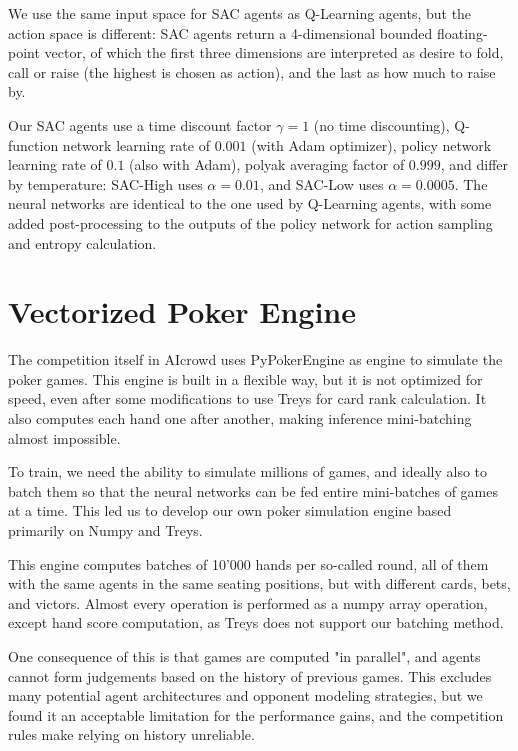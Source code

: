 We use the same input space for SAC agents as Q-Learning agents, but the action space is different: SAC agents return a 4-dimensional bounded floating-point vector, of which the first three dimensions are interpreted as desire to fold, call or raise (the highest is chosen as action), and the last as how much to raise by.

Our SAC agents use a time discount factor $\gamma = 1$ (no time discounting), Q-function network learning rate of $0.001$ (with Adam optimizer), policy network learning rate of $0.1$ (also with Adam), polyak averaging factor of $0.999$, and differ by temperature: SAC-High uses $\alpha = 0.01$, and SAC-Low uses $\alpha = 0.0005$. The neural networks are identical to the one used by Q-Learning agents, with some added post-processing to the outputs of the policy network for action sampling and entropy calculation.

\section{Vectorized Poker Engine}
The competition itself in AIcrowd uses PyPokerEngine \cite{Pypokerengine} as engine to simulate the poker games. This engine is built in a flexible way, but it is not optimized for speed, even after some modifications to use Treys \cite{Treys} for card rank calculation. It also computes each hand one after another, making inference mini-batching almost impossible.

To train, we need the ability to simulate millions of games, and ideally also to batch them so that the neural networks can be fed entire mini-batches of games at a time. This led us to develop our own poker simulation engine based primarily on Numpy \cite{Numpy} and Treys.

This engine computes batches of 10'000 hands per so-called round, all of them with the same agents in the same seating positions, but with different cards, bets, and victors. Almost every operation is performed as a numpy array operation, except hand score computation, as Treys does not support our batching method.

One consequence of this is that games are computed "in parallel", and agents cannot form judgements based on the history of previous games. This excludes many potential agent architectures and opponent modeling strategies, but we found it an acceptable limitation for the performance gains, and the competition rules make relying on history unreliable.

